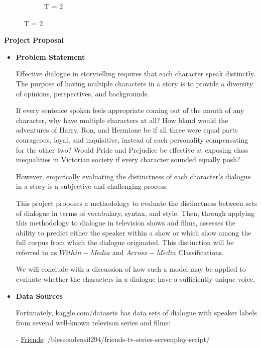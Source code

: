 \documentclass{article}
\begin{document}
\begin{titlepage}
\begin{figure}[H]
\begin{subfigure}[b]{0.45\textwidth}
            \caption{T = 2}
            \label{fig:subfig2}
        \end{subfigure}
        \label{fig:main}
    \end{figure} 
        { \Large \bfseries Project Proposal}

        \begin{itemize}
            \item[] \textbf{Problem Statement}
            
			Effective dialogue in storytelling requires that each character speak distinctly.
			The purpose of having multiple characters in a story is to provide a diversity of opinions, perspectives, and backgrounds.
			
			If every sentence spoken feels appropriate coming out of the mouth of any character, why have multiple characters at all?
			How bland would the adventures of Harry, Ron, and Hermione be if all three were equal parts courageous, loyal, and inquisitive, instead of each personality compensating for the other two?
			Would Pride and Prejudice be effective at exposing class inequalities in Victorian society if every character sounded equally posh?

			However, empirically evaluating the distinctness of each character's dialogue in a story is a subjective and challenging process. 

			This project proposes a methodology to evaluate the distinctness between sets of dialogue in terms of vocabulary, syntax, and style.
			Then, through applying this methodology to dialogue in television shows and films, assesses the ability to predict either the speaker within a show or which show among the full corpus from which the dialogue originated.
			This distinction will be referred to as $Within-Media$ and $Across-Media$ Classifications.
			
			We will conclude with a discussion of how such a model may be applied to evaluate whether the characters in a dialogue have a sufficiently unique voice. 

            \item[] \textbf{Data Sources}
            
			Fortunately, kaggle.com/datasets has data sets of dialogue with speaker labels from several well-known televison series and films:

			- \href{https://www.kaggle.com/datasets/blessondensil294/friends-tv-series-screenplay-script/data?select=S01E01+Monica+Gets+A+Roommate.txt}{Friends}: /blessondensil294/friends-tv-series-screenplay-script/
			 

\end{itemize}
\end{titlepage}
\end{document}
